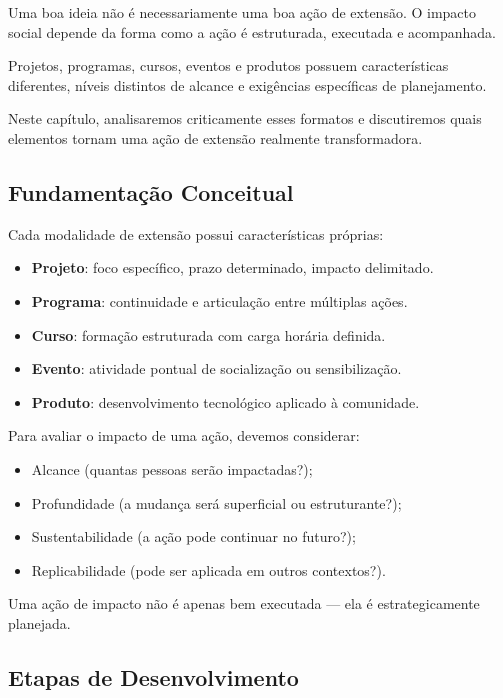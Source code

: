 \documentclass[12pt,a4paper]{article}
\begin{document}
Uma boa ideia não é necessariamente uma boa ação de extensão. 
O impacto social depende da forma como a ação é estruturada, executada e acompanhada.

Projetos, programas, cursos, eventos e produtos possuem características diferentes, níveis distintos de alcance e exigências específicas de planejamento.

Neste capítulo, analisaremos criticamente esses formatos e discutiremos quais elementos tornam uma ação de extensão realmente transformadora.

\subsection*{Fundamentação Conceitual}

Cada modalidade de extensão possui características próprias:

\begin{itemize}
    \item \textbf{Projeto}: foco específico, prazo determinado, impacto delimitado.
    \item \textbf{Programa}: continuidade e articulação entre múltiplas ações.
    \item \textbf{Curso}: formação estruturada com carga horária definida.
    \item \textbf{Evento}: atividade pontual de socialização ou sensibilização.
    \item \textbf{Produto}: desenvolvimento tecnológico aplicado à comunidade.
\end{itemize}

Para avaliar o impacto de uma ação, devemos considerar:

\begin{itemize}
    \item Alcance (quantas pessoas serão impactadas?);
    \item Profundidade (a mudança será superficial ou estruturante?);
    \item Sustentabilidade (a ação pode continuar no futuro?);
    \item Replicabilidade (pode ser aplicada em outros contextos?).
\end{itemize}

Uma ação de impacto não é apenas bem executada — ela é estrategicamente planejada.

\subsection*{Etapas de Desenvolvimento}
\end{document}
